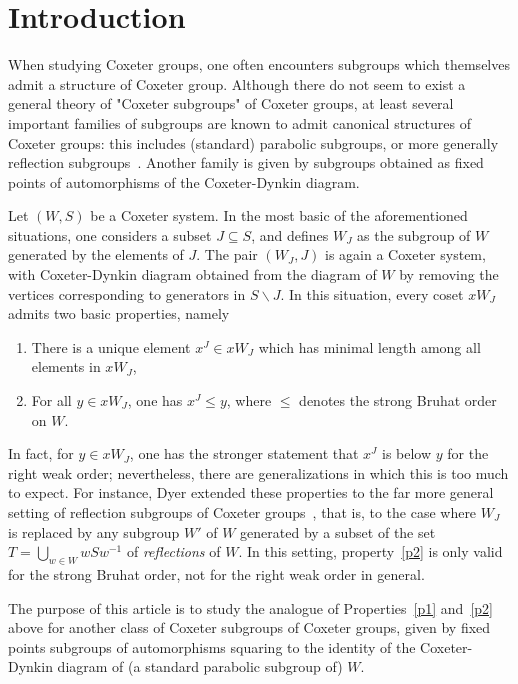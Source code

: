\documentclass[11pt]{article}
\theoremstyle{definition}
\numberwithin{equation}{section}
\begin{document}
\section{Introduction}

When studying Coxeter groups, one often encounters subgroups which themselves admit a structure of Coxeter group. Although there do not seem to exist a general theory of "Coxeter subgroups" of Coxeter groups, at least several important families of subgroups are known to admit canonical structures of Coxeter groups: this includes (standard) parabolic subgroups, or more generally reflection subgroups~\cite{Deodhar, Dyer_subgroups}. Another family is given by subgroups obtained as fixed points of automorphisms of the Coxeter-Dynkin diagram. 

Let $(W,S)$ be a Coxeter system. In the most basic of the aforementioned situations, one considers a subset $J\subseteq S$, and defines $W_J$ as the subgroup of $W$ generated by the elements of $J$. The pair $(W_J, J)$ is again a Coxeter system, with Coxeter-Dynkin diagram obtained from the diagram of $W$ by removing the vertices corresponding to generators in $S\backslash J$. In this situation, every coset $x W_J$ admits two basic properties, namely
\begin{enumerate}
\item \label{p1}
There is a unique element $x^J\in x W_J$ which has minimal length among all elements in $x W_J$,
\item \label{p2}
For all $y\in x W_J$, one has $x^J \leq y$, where $\leq$ denotes the strong Bruhat order on $W$.
\end{enumerate}

In fact, for $y\in x W_J$, one has the stronger statement that $x^J$ is below $y$ for the right weak order; nevertheless, there are generalizations in which this is too much to expect. For instance, Dyer extended these properties to the far more general setting of reflection subgroups of Coxeter groups~\cite[Theorem 1.4]{Dyer_Bruhat}, that is, to the case where $W_J$ is replaced by any subgroup $W'$ of $W$ generated by a subset of the set $T=\bigcup_{w\in W} w S w^{-1}$ of \textit{reflections} of $W$. In this setting, property~\ref{p2} is only valid for the strong Bruhat order, not for the right weak order in general.  

The purpose of this article is to study the analogue of Properties~\ref{p1} and~\ref{p2} above for another class of Coxeter subgroups of Coxeter groups, given by fixed points subgroups of automorphisms squaring to the identity of the Coxeter-Dynkin diagram of (a standard parabolic subgroup of) $W$. 
\end{document}
